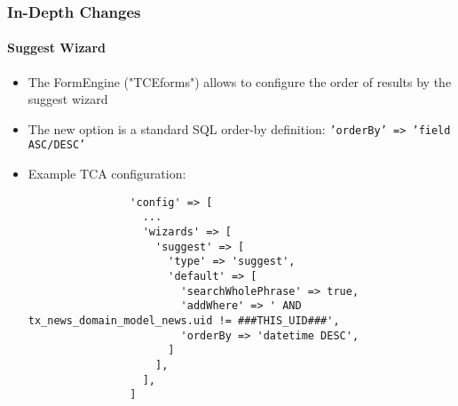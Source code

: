 \begin{frame}[fragile]
	\frametitle{In-Depth Changes}
	\framesubtitle{Suggest Wizard}

	\lstset{basicstyle=\tiny\ttfamily}

	\begin{itemize}
		\item The FormEngine ("TCEforms") allows to configure the order of results by the suggest wizard
		\item The new option is a standard SQL order-by definition:\newline
			\small\texttt{'orderBy' => 'field ASC/DESC'}\normalsize
		\item Example TCA configuration:

			\begin{lstlisting}
				'config' => [
				  ...
				  'wizards' => [
				    'suggest' => [
				      'type' => 'suggest',
				      'default' => [
				        'searchWholePhrase' => true,
				        'addWhere' => ' AND tx_news_domain_model_news.uid != ###THIS_UID###',
				        'orderBy => 'datetime DESC',
				      ]
				    ],
				  ],
				]
			\end{lstlisting}

	\end{itemize}

\end{frame}











